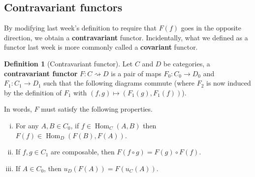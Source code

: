 \documentclass{article}
\theoremstyle{definition}
\newtheorem{defn}[thm]{Definition}
\theoremstyle{remark}
\DeclareMathOperator{\Hom}{Hom}
\begin{document}
\subsection{Contravariant functors}
By modifying last week's definition to require that $F(f)$ goes in the opposite direction, we obtain a \textbf{contravariant} functor. Incidentally, what we defined as a functor last week is more commonly called a \textbf{covariant} functor.
\begin{defn}[Contravariant functor]
	Let $C$ and $D$ be categories, a \textbf{contravariant functor} $F: C \rightsquigarrow D$ is a pair of maps $F_0:C_0 \rightarrow D_0$ and $F_1:C_1 \rightarrow D_1$ such that the following diagrams commute (where $F_2$ is now induced by the definition of $F_1$ with $(f,g) \mapsto (F_1(g), F_1(f))$).
	\begin{figure}[h]
		\centering
		\qquad 
		\qquad
	\end{figure}
	\newpage
	In words, $F$ must satisfy the following properties.
	\begin{enumerate}[i.]
		\item For any $A, B \in C_0$, if $f \in \Hom_C(A,B)$ then $F(f) \in \Hom_D(F(B), F(A))$.
		\item If $f,g \in C_1$ are composable, then $F(f\circ g) = F(g) \circ F(f)$.
		\item If $A \in C_0$, then $u_D(F(A)) = F(u_C(A))$.
	\end{enumerate}
\end{defn}
\end{document}
